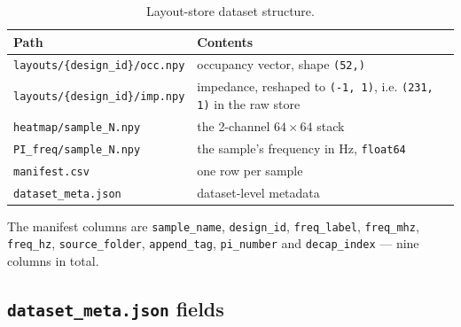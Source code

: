 \begin{table}[htbp]
\centering
\caption{Layout-store dataset structure.}
\label{tab:appA_store}
\begin{tabular}{p{} p{}}
\hline
Path & Contents \\
\hline
\texttt{layouts/\{design\_id\}/occ.npy} & occupancy vector, shape \texttt{(52,)} \\
\texttt{layouts/\{design\_id\}/imp.npy} & impedance, reshaped to \texttt{(-1, 1)}, i.e.
\texttt{(231, 1)} in the raw store \\
\texttt{heatmap/sample\_N.npy} & the 2-channel $64\times64$ stack \\
\texttt{PI\_freq/sample\_N.npy} & the sample's frequency in Hz, \texttt{float64} \\
\texttt{manifest.csv} & one row per sample \\
\texttt{dataset\_meta.json} & dataset-level metadata \\
\hline
\end{tabular}
\end{table}

The manifest columns are \texttt{sample\_name}, \texttt{design\_id}, \texttt{freq\_label},
\texttt{freq\_mhz}, \texttt{freq\_hz}, \texttt{source\_folder}, \texttt{append\_tag},
\texttt{pi\_number} and \texttt{decap\_index} --- nine columns in total.

\subsection{\texttt{dataset\_meta.json} fields}
\label{subsec:appA_meta_fields}

